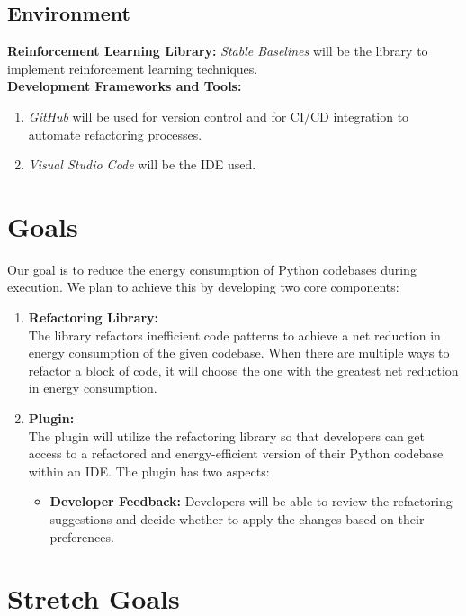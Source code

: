 \documentclass{article}
\begin{document}
\subsection{Environment}
\textbf{Reinforcement Learning Library:} \textit{Stable Baselines} will be the library to implement reinforcement learning techniques.\\
\textbf{Development Frameworks and Tools:} 
\begin{enumerate}

    \item \textit{GitHub} will be used for version control and for CI/CD integration to automate refactoring processes.
    \item \textit{Visual Studio Code} will be the IDE used.
    
\end{enumerate} 


\section{Goals}

Our goal is to reduce the energy consumption of Python codebases during execution. We plan to achieve this by developing two core components:

\begin{enumerate}
    \item \textbf{Refactoring Library:} \\
    The library refactors inefficient code patterns to achieve a net reduction in energy consumption of the given codebase. When there are multiple ways to refactor a block of code, it will choose the one with the greatest net reduction in energy consumption.

    \item \textbf{Plugin:} \\
    The plugin will utilize the refactoring library so that developers can get access to a refactored and energy-efficient version of their Python codebase within an IDE. The plugin has two aspects:

    \begin{itemize}
        \item \textbf{Developer Feedback:} Developers will be able to review the refactoring suggestions and decide whether to apply the changes based on their preferences.
    \end{itemize}
\end{enumerate}

\section{Stretch Goals}
\end{document}
